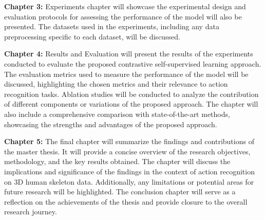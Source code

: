 \textbf{Chapter 3:} Experiments chapter will showcase the experimental design and evaluation protocols for assessing the performance of the model will also be presented. The datasets used in the experiments, including any data preprocessing specific to each dataset, will be discussed.

\textbf{Chapter 4:} Results and Evaluation
will present the results of the experiments conducted to evaluate the proposed contrastive self-supervised learning approach. The evaluation metrics used to measure the performance of the model will be discussed, highlighting the chosen metrics and their relevance to action recognition tasks. Ablation studies will be conducted to analyze the contribution of different components or variations of the proposed approach. The chapter will also include a comprehensive comparison with state-of-the-art methods, showcasing the strengths and advantages of the proposed approach.

\textbf{Chapter 5:}
The final chapter will summarize the findings and contributions of the master thesis. It will provide a concise overview of the research objectives, methodology, and the key results obtained. The chapter will discuss the implications and significance of the findings in the context of action recognition on 3D human skeleton data. Additionally, any limitations or potential areas for future research will be highlighted. The conclusion chapter will serve as a reflection on the achievements of the thesis and provide closure to the overall research journey.